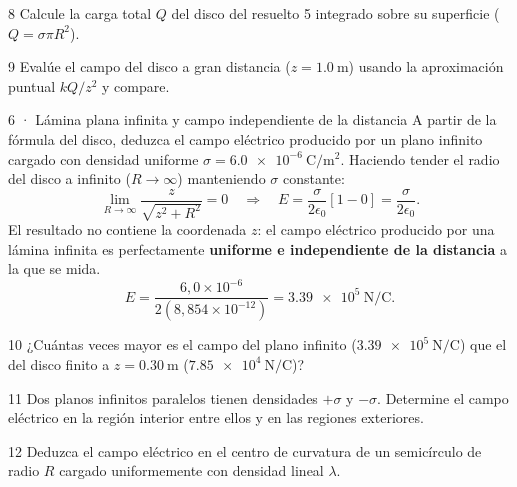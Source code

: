 \documentclass[11pt]{article}
\begin{document}
\begin{eReto}{8 }
Calcule la carga total $Q$ del disco del resuelto 5 integrado sobre su superficie ($Q=\sigma\pi R^2$).
\end{eReto}

\begin{eReto}{9 }
Evalúe el campo del disco a gran distancia ($z=\SI{1,0}{\metre}$) usando la aproximación puntual $kQ/z^2$ y compare.
\end{eReto}


\begin{eResuelto}{6 · Lámina plana infinita y campo independiente de la distancia}
A partir de la fórmula del disco, deduzca el campo eléctrico producido por un plano infinito cargado con densidad uniforme $\sigma=\SI{6,0e-6}{\coulomb\per\metre\squared}$.
Haciendo tender el radio del disco a infinito ($R\to\infty$) manteniendo $\sigma$ constante:
\[ \lim_{R\to\infty}\frac{z}{\sqrt{z^2+R^2}} = 0 \quad\Rightarrow\quad E = \frac{\sigma}{2\epsilon_0}[1 - 0] = \frac{\sigma}{2\epsilon_0}. \]
El resultado no contiene la coordenada $z$: el campo eléctrico producido por una lámina infinita es perfectamente \textbf{uniforme e independiente de la distancia} a la que se mida.
\[ E = \frac{6{,}0\times10^{-6}}{2(8{,}854\times10^{-12})} = \SI{3,39e5}{\newton\per\coulomb}. \]
\end{eResuelto}

\begin{eReto}{10 }
¿Cuántas veces mayor es el campo del plano infinito ($\SI{3,39e5}{\newton\per\coulomb}$) que el del disco finito a $z=\SI{0,30}{\metre}$ ($\SI{7,85e4}{\newton\per\coulomb}$)?
\end{eReto}

\begin{eReto}{11 }
Dos planos infinitos paralelos tienen densidades $+\sigma$ y $-\sigma$. Determine el campo eléctrico en la región interior entre ellos y en las regiones exteriores.
\end{eReto}

\begin{eReto}{12 }
Deduzca el campo eléctrico en el centro de curvatura de un semicírculo de radio $R$ cargado uniformemente con densidad lineal $\lambda$.
\end{eReto}
\end{document}
